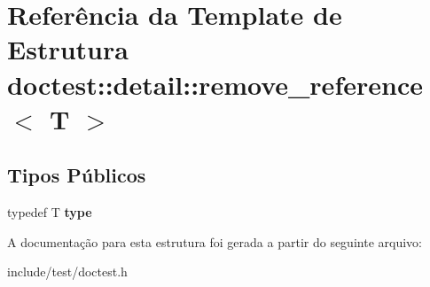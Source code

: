 \hypertarget{structdoctest_1_1detail_1_1remove__reference}{}\section{Referência da Template de Estrutura doctest\+:\+:detail\+:\+:remove\+\_\+reference$<$ T $>$}
\label{structdoctest_1_1detail_1_1remove__reference}
\subsection*{Tipos Públicos}
\begin{DoxyCompactItemize}
\item 
\mbox{\label{structdoctest_1_1detail_1_1remove__reference_ab3cba0e8bc4c71b7f4ecdf85476ec4cc}} 
typedef T {\bfseries type}
\end{DoxyCompactItemize}


A documentação para esta estrutura foi gerada a partir do seguinte arquivo\+:\begin{DoxyCompactItemize}
\item 
include/test/doctest.\+h\end{DoxyCompactItemize}
